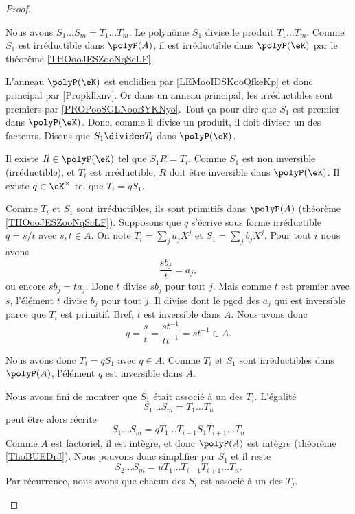 \begin{proof}
\begin{subproof}

		Nous avons \( S_1\ldots S_m=T_1\ldots T_m\). Le polynôme \( S_1\) divise le produit \( T_1\ldots T_m\). Comme \( S_1\) est irréductible dans \( \polyP(A)\), il est irréductible dans \( \polyP(\eK)\) par le théorème \ref{THOooJESZooNqScLF}.

		L'anneau \( \polyP(\eK)\) est euclidien par \ref{LEMooIDSKooQfkeKp} et donc principal par \ref{Propkllxnv}. Or dans un anneau principal, les irréductibles sont premiers par \ref{PROPooSGLNooBYKNyo}. Tout ça pour dire que \( S_1\) est premier dans \( \polyP(\eK)\). Donc, comme il divise un produit, il doit diviser un des facteurs. Disons que \( S_1\divides T_i\) dans \( \polyP(\eK)\).

		Il existe \( R\in \polyP(\eK)\) tel que \( S_1R=T_i\). Comme \( S_1\) est non inversible (irréductible), et \( T_i\) est irréductible, \( R\) doit être inversible dans \( \polyP(\eK)\). Il existe \( q\in \eK^{\times }\) tel que \( T_i=qS_1\).

		Comme \( T_i\) et \( S_1\) sont irréductibles, ils sont primitifs dans \( \polyP(A)\) (théorème \ref{THOooJESZooNqScLF}). Supposons que \( q\) s'écrive sous forme irréductible \( q=s/t\) avec \( s,t\in A\). On note \( T_i=\sum_ja_jX^j\) et \( S_1=\sum_jb_jX^j\). Pour tout \( i\) nous avons
		\begin{equation}
			\frac{ sb_j }{ t }=a_j,
		\end{equation}
		ou encore \( sb_j=ta_j\). Donc \( t\) divise \( sb_j\) pour tout \( j\). Mais comme \( t\) est premier avec \( s\), l'élément \( t\) divise \( b_j\) pour tout \( j\). Il divise dont le pgcd des \( a_j\) qui est inversible parce que \( T_i\) est primitif. Bref, \( t\) est inversible dans \( A\). Nous avons donc
		\begin{equation}
			q=\frac{ s }{ t }=\frac{ st^{-1} }{ tt^{-1} }=st^{-1}\in A.
		\end{equation}

		Nous avons donc \( T_i=qS_1\) avec \( q\in A\). Comme \( T_i\) et \( S_1\) sont irréductibles dans \( \polyP(A)\), l'élément \( q\) est inversible dans \( A\).

		Nous avons fini de montrer que \( S_1\) était associé à un des \( T_i\). L'égalité
		\begin{equation}
			S_1\ldots S_m=T_1\ldots T_n
		\end{equation}
		peut être alors récrite
		\begin{equation}
			S_1\ldots S_m=qT_1\ldots T_{i-1}S_1T_{i+1}\ldots T_n
		\end{equation}
		Comme \( A\) est factoriel, il est intègre, et donc \( \polyP(A)\) est intègre (théorème \ref{ThoBUEDrJ}). Nous pouvons donc simplifier par \( S_1\) et il reste
		\begin{equation}
			S_2\ldots S_m=uT_1\ldots T_{i-1}T_{i+1}\ldots T_n.
		\end{equation}
		Par récurrence, nous avons que chacun des \( S_i\) est associé à un des \( T_j\).
	\end{subproof}
\end{proof}

